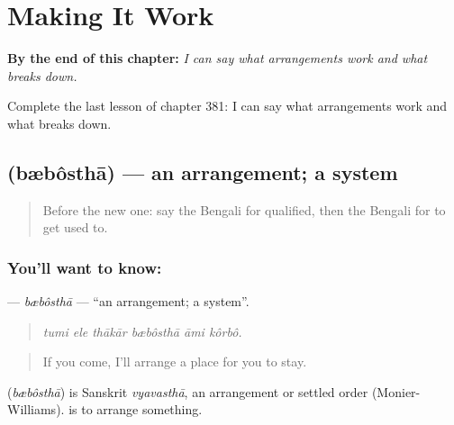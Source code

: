 
\chapter{Making It Work}
\label{ch:bn-making-it-work}

\begin{chapteropening}
\textbf{By the end of this chapter:} \emph{I can say what arrangements work and what breaks down.}

Complete the last lesson of chapter 381: I can say what arrangements work and what breaks down.
\end{chapteropening}

\section[\texorpdfstring{\bn{ব্যবস্থা} (bæbôsthā)}{ব্যবস্থা (bæbôsthā)}]{ (bæbôsthā) — an arrangement; a system}

\label{lesson:BN-C381-bebostha}



\begin{quote}
Before the new one: say the Bengali for qualified, then the Bengali for to get used to.
\end{quote}

\subsection*{You'll want to know: }
\textbf{} — \emph{bæbôsthā} — \textquotedblleft{}an arrangement; a system\textquotedblright{}.

\begin{quote}
     
\end{quote}

\begin{quote}
\emph{tumi ele thākār bæbôsthā āmi kôrbô.}
\end{quote}

\begin{quote}
If you come, I'll arrange a place for you to stay.
\end{quote}

\begin{cousinweb}
\textbf{} (\emph{bæbôsthā}) is Sanskrit \emph{vyavasthā}, an arrangement or settled order (Monier-Williams).   is to arrange something.
\end{cousinweb}

